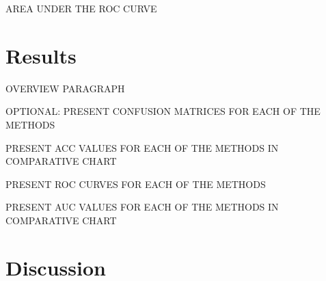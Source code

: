 \documentclass[12pt]{article}
\begin{document}
AREA UNDER THE ROC CURVE

\section{Results}
\label{sec:resu}

OVERVIEW PARAGRAPH

OPTIONAL: PRESENT CONFUSION MATRICES FOR EACH OF THE METHODS

PRESENT ACC VALUES FOR EACH OF THE METHODS IN COMPARATIVE CHART

PRESENT ROC CURVES FOR EACH OF THE METHODS

PRESENT AUC VALUES FOR EACH OF THE METHODS IN COMPARATIVE CHART

\section{Discussion}
\label{sec:disc}







\end{document}
